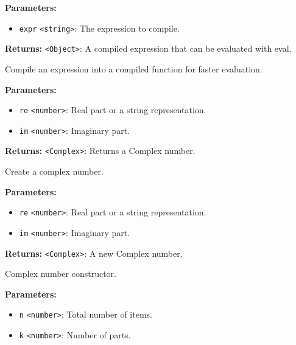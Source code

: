 \documentclass[12pt,a4paper]{article}
\begin{document}
\noindent \textbf{Parameters:}
\begin{itemize}
  \item \texttt{expr} \texttt{<string>}: The expression to compile.
\end{itemize}

\noindent \textbf{Returns:} \texttt{<Object>}: A compiled expression that can be evaluated with \textasciigrave{}eval\textasciigrave{}.

\noindent Compile an expression into a compiled function for faster evaluation.

\vspace{5mm}
\noindent {}


\noindent \textbf{Parameters:}
\begin{itemize}
  \item \texttt{re} \texttt{<number>}: Real part or a string representation.
  \item \texttt{im} \texttt{<number>}: Imaginary part.
\end{itemize}

\noindent \textbf{Returns:} \texttt{<Complex>}: Returns a Complex number.

\noindent Create a complex number.

\vspace{5mm}
\noindent {}


\noindent \textbf{Parameters:}
\begin{itemize}
  \item \texttt{re} \texttt{<number>}: Real part or a string representation.
  \item \texttt{im} \texttt{<number>}: Imaginary part.
\end{itemize}

\noindent \textbf{Returns:} \texttt{<Complex>}: A new Complex number.

\noindent Complex number constructor.

\vspace{5mm}
\noindent {}


\noindent \textbf{Parameters:}
\begin{itemize}
  \item \texttt{n} \texttt{<number>}: Total number of items.
  \item \texttt{k} \texttt{<number>}: Number of parts.
\end{itemize}
\end{document}
